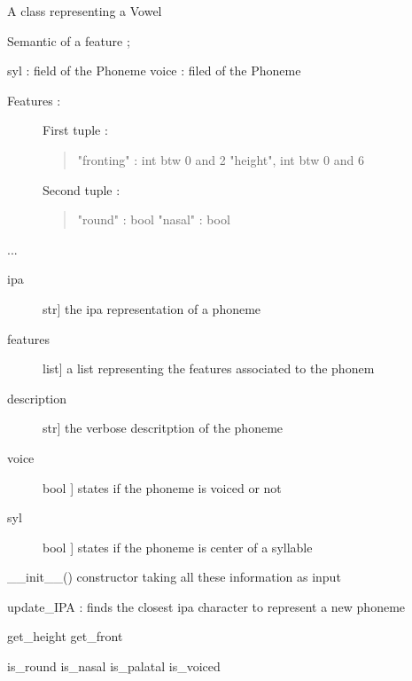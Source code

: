 \documentclass[letterpaper,10pt,english]{sphinxmanual}
\begin{document}

\begin{fulllineitems}
\label{\detokenize{index:Phoneme.Vowel}}
\sphinxAtStartPar
A class representing a Vowel

\sphinxAtStartPar
Semantic of a feature ;

\sphinxAtStartPar
syl : field of the Phoneme
voice : filed of the Phoneme
\begin{description}
\item[{Features :}] \leavevmode
\sphinxAtStartPar
First tuple :
\begin{quote}

\sphinxAtStartPar
"fronting" : int  btw 0 and 2
"height", int btw 0 and 6
\end{quote}

\sphinxAtStartPar
Second tuple :
\begin{quote}

\sphinxAtStartPar
"round" : bool
"nasal" : bool
\end{quote}

\end{description}

\sphinxAtStartPar
...
\begin{description}
\item[{ipa}] \leavevmode{[}str{]}
\sphinxAtStartPar
the ipa representation of a phoneme

\item[{features}] \leavevmode{[}list{]}
\sphinxAtStartPar
a list representing the features associated to the phonem

\item[{description}] \leavevmode{[}str{]}
\sphinxAtStartPar
the verbose descritption of the phoneme

\item[{voice}] \leavevmode{[}bool {]}
\sphinxAtStartPar
states if the phoneme is voiced or not

\item[{syl}] \leavevmode{[}bool {]}
\sphinxAtStartPar
states if the phoneme is center of a syllable

\end{description}

\sphinxAtStartPar
\_\_init\_\_() constructor taking all these information as input

\sphinxAtStartPar
update\_IPA  : finds the closest ipa character to represent a new phoneme

\sphinxAtStartPar
get\_height
get\_front

\sphinxAtStartPar
is\_round
is\_nasal
is\_palatal
is\_voiced

\end{fulllineitems}
\end{document}
